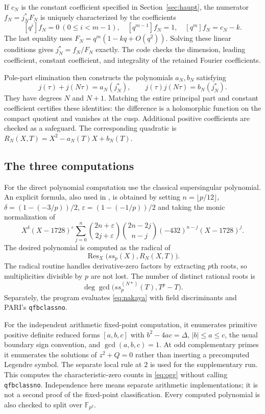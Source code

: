 \documentclass[11pt,a4paper]{article}
\theoremstyle{remark}\newtheorem{remark}[theorem]{Remark}
\numberwithin{equation}{section}
\begin{document}
	If $c_N$ is the constant coefficient specified in Section~\ref{sec:haupt}, the numerator $f_N=j_N^*F_N$ is uniquely characterized by the coefficients
	\[
	[q^i]f_N=0\ (0\leq i<m-1),\quad
	[q^{m-1}]f_N=1,\quad [q^m]f_N=c_N-k.
	\]
	The last equality uses $F_N=q^m(1-kq+O(q^2))$. Solving these linear conditions gives $j_N^*=f_N/F_N$ exactly. The code checks the dimension, leading coefficient, constant coefficient, and integrality of the retained Fourier coefficients.
	
	Pole-part elimination then constructs the polynomials $a_N,b_N$ satisfying
	\[
	j(\tau)+j(N\tau)=a_N(j_N^*),\qquad
	j(\tau)j(N\tau)=b_N(j_N^*).
	\]
	They have degrees $N$ and $N+1$. Matching the entire principal part and constant coefficient certifies these identities: the difference is a holomorphic function on the compact quotient and vanishes at the cusp. Additional positive coefficients are checked as a safeguard. The corresponding quadratic is $R_N(X,T)=X^2-a_N(T)X+b_N(T)$.
	
	\subsection{The three computations}
	For the direct polynomial computation use the classical supersingular polynomial. An explicit formula, also used in \cite{Morton5b}, is obtained by setting $n=\lfloor p/12\rfloor$, $\delta=(1-(-3/p))/2$, $\varepsilon=(1-(-1/p))/2$ and taking the monic normalization of
	\[
	X^\delta(X-1728)^\varepsilon
	\sum_{j=0}^{n}\binom{2n+\varepsilon}{2j+\varepsilon}
	\binom{2n-2j}{n-j}(-432)^{n-j}(X-1728)^j.
	\]
	The desired polynomial is computed as the radical of
	\[
	\operatorname{Res}_X\bigl(ss_p(X),R_N(X,T)\bigr).
	\]
	The radical routine handles derivative-zero factors by extracting $p$th roots, so multiplicities divisible by $p$ are not lost. The number of distinct rational roots is
	\[
	\deg\gcd\bigl(ss_p^{(N*)}(T),T^p-T\bigr).
	\]
	Separately, the program evaluates \eqref{eq:nakaya} with field discriminants and PARI's \texttt{qfbclassno}.
	
	For the independent arithmetic fixed-point computation, it enumerates primitive positive definite reduced forms $[a,b,c]$ with $b^2-4ac=\Delta$, $|b|\leq a\leq c$, the usual boundary sign convention, and $\gcd(a,b,c)=1$. At odd complementary primes it enumerates the solutions of $z^2+Q=0$ rather than inserting a precomputed Legendre symbol. The separate local rule at $2$ is used for the supplementary run. This computes the characteristic-zero counts in \eqref{eq:ogg} without calling \texttt{qfbclassno}. Independence here means separate arithmetic implementations; it is not a second proof of the fixed-point classification. Every computed polynomial is also checked to split over $\mathbb F_{p^2}$.
	
\end{document}
